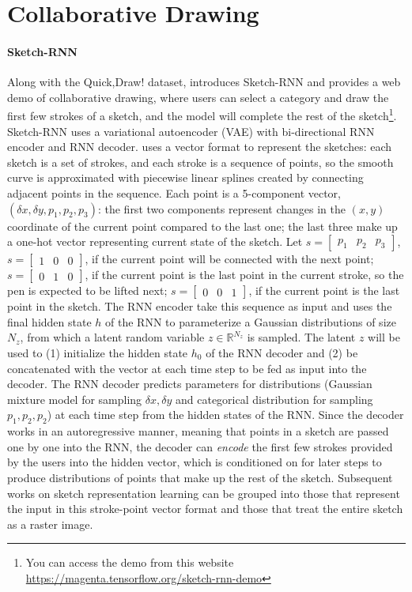 \section{Collaborative Drawing}

\paragraph{Sketch-RNN}
Along with the Quick,Draw! dataset, \cite{ha2017neural} introduces Sketch-RNN and provides a web demo of collaborative drawing, where users can select a category and draw the first few strokes of a sketch, and the model will complete the rest of the sketch\footnote{You can access the demo from this website \url{https://magenta.tensorflow.org/sketch-rnn-demo}}. Sketch-RNN uses a variational autoencoder (VAE) with bi-directional RNN encoder and RNN decoder. 
\cite{ha2017neural} uses a vector format to represent the sketches: each sketch is a set of strokes, and each stroke is a sequence of points, so the smooth curve is approximated with piecewise linear splines created by connecting adjacent points in the sequence. Each point is a 5-component vector, $(\delta x, \delta y, p_1, p_2, p_3)$: the first two components represent changes in the $(x,y)$ coordinate of the current point compared to the last one; the last three make up a one-hot vector representing current state of the sketch. Let $s = \begin{bmatrix}p_1 & p_2 & p_3\end{bmatrix}$,
$ s = \begin{bmatrix}1 & 0 & 0\end{bmatrix}$, if the current point will be connected with the next point;
$s = \begin{bmatrix}0 & 1 & 0\end{bmatrix}$, if the current point is the last point in the current stroke, so the pen is expected to be lifted next;
$s = \begin{bmatrix}0 & 0 & 1\end{bmatrix}$, if the current point is the last point in the sketch.     
The RNN encoder take this sequence as input and uses the final hidden state $h$ of the RNN to parameterize a Gaussian distributions of size $N_z$, from which a latent random variable $z \in \mathbb{R}^{N_z}$ is sampled. The latent $z$ will be used to (1) initialize the hidden state $h_0$ of the RNN decoder and (2) be concatenated with the vector at each time step to be fed as input into the decoder.  
The RNN decoder predicts parameters for distributions (Gaussian mixture model for sampling $\delta x, \delta y$ and categorical distribution for sampling $p_1,p_2,p_2$) at each time step from the hidden states of the RNN. Since the decoder works in an autoregressive manner, meaning that points in a sketch are passed one by one into the RNN, the decoder can \textit{encode} the first few strokes provided by the users into the hidden vector, which is conditioned on for later steps to produce distributions of points that make up the rest of the sketch. 
Subsequent works on sketch representation learning can be grouped into those that represent the input in this stroke-point vector format and those that treat the entire sketch as a raster image. 

